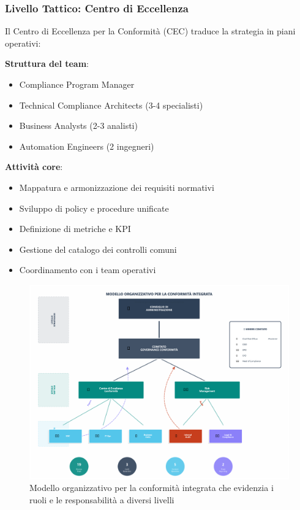 \subsubsection{Livello Tattico: Centro di Eccellenza}

Il Centro di Eccellenza per la Conformità (CEC) traduce la strategia in piani operativi:

\textbf{Struttura del team}:
\begin{itemize}
    \item Compliance Program Manager
    \item Technical Compliance Architects (3-4 specialisti)
    \item Business Analysts (2-3 analisti)
    \item Automation Engineers (2 ingegneri)
\end{itemize}

\textbf{Attività core}:
\begin{itemize}
    \item Mappatura e armonizzazione dei requisiti normativi
    \item Sviluppo di policy e procedure unificate
    \item Definizione di metriche e KPI
    \item Gestione del catalogo dei controlli comuni
    \item Coordinamento con i team operativi
\end{itemize}

\begin{figure}[h]
\centering


\includegraphics[width=1\textwidth]{thesis_figures/cap4/organigramma_moderno.pdf
}
\caption[Modello organizzativo per la conformità integrata]{Modello organizzativo per la conformità integrata che evidenzia i ruoli e le responsabilità a diversi livelli}
\label{fig:org_structure}
\end{figure}

